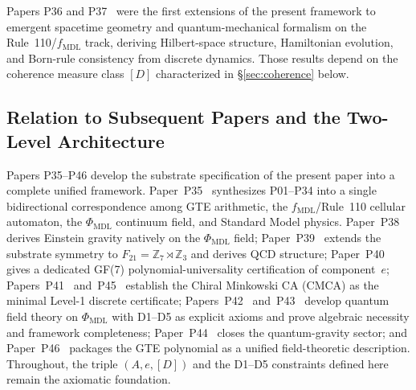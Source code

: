 \documentclass[12pt,letterpaper]{article}
\newcommand{\fmdl}{f_{\mathrm{MDL}}}
\newcommand{\Zseven}{\mathbb{Z}_7}
\newcommand{\Zthree}{\mathbb{Z}_3}
\newcommand{\Dclass}{[D]}
\begin{document}
Papers P36 and P37~\cite{SpivackEmergentGravity,SpivackBornRule} were the first extensions of the present framework to emergent spacetime geometry
and quantum-mechanical formalism on the Rule~110/$\fmdl$ track, deriving Hilbert-space structure, Hamiltonian
evolution, and Born-rule consistency from discrete dynamics.  Those results depend on
the coherence measure class $\Dclass$ characterized in \S\ref{sec:coherence} below.

\subsection{Relation to Subsequent Papers and the Two-Level Architecture}
\label{sec:subsequent-papers}

Papers P35--P46 develop the substrate specification of the present paper into a
complete unified framework.  Paper~P35~\cite{SpivackGTEUnification} synthesizes
P01--P34 into a single bidirectional correspondence among GTE arithmetic, the
$\fmdl$/Rule~110 cellular automaton, the $\Phi_{\mathrm{MDL}}$ continuum field, and
Standard Model physics.  Paper~P38~\cite{SpivackPhiMDLGravity} derives Einstein
gravity natively on the $\Phi_{\mathrm{MDL}}$ field; Paper~P39~\cite{SpivackGTEQCDStructure}
extends the substrate symmetry to $F_{21} = \Zseven \rtimes \Zthree$ and derives QCD
structure; Paper~P40~\cite{SpivackGF7Universality} gives a dedicated GF(7)
polynomial-universality certification of component~$e$; Papers~P41~\cite{SpivackCMCA}
and~P45~\cite{SpivackThreeTapeCMCA} establish the Chiral Minkowski CA (CMCA) as the
minimal Level-1 discrete certificate; Papers~P42~\cite{SpivackPhiMDLField}
and~P43~\cite{SpivackCompleteness} develop quantum field theory on $\Phi_{\mathrm{MDL}}$
with D1--D5 as explicit axioms and prove algebraic necessity and framework
completeness; Paper~P44~\cite{SpivackQGR} closes the quantum-gravity sector; and
Paper~P46~\cite{SpivackGTEPolynomialUFT} packages the GTE polynomial as a unified
field-theoretic description.  Throughout, the triple $(A, e, \Dclass)$ and the
D1--D5 constraints defined here remain the axiomatic foundation.
\end{document}
